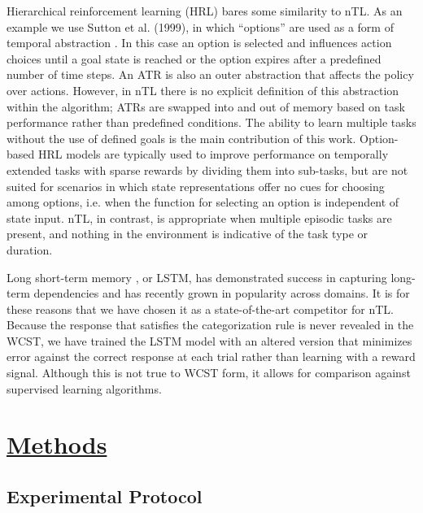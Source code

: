 \documentclass[10pt,letterpaper]{article}
\begin{document}
Hierarchical reinforcement learning (HRL) bares some similarity to nTL. As an example we use Sutton et al. (1999), in which ``options'' are used as a form of temporal abstraction \cite{sutton_between_1999}. In this case an option is selected and influences action choices until a goal state is reached or the option expires after a predefined number of time steps. An ATR is also an outer abstraction that affects the policy over actions. However, in nTL there is no explicit definition of this abstraction within the algorithm; ATRs are swapped into and out of memory based on task performance rather than predefined conditions. The ability to learn multiple tasks without the use of defined goals is the main contribution of this work. Option-based HRL models are typically used to improve performance on temporally extended tasks with sparse rewards by dividing them into sub-tasks, but are not suited for scenarios in which state representations offer no cues for choosing among options, i.e. when the function for selecting an option is independent of state input. nTL, in contrast, is appropriate when multiple episodic tasks are present, and nothing in the environment is indicative of the task type or duration.

Long short-term memory \cite{hochreiter_long_1997}, or LSTM, has demonstrated success in capturing long-term dependencies and has recently grown in popularity across domains. It is for these reasons that we have chosen it as a state-of-the-art competitor for nTL. Because the response that satisfies the categorization rule is never revealed in the WCST, we have trained the LSTM model with an altered version that minimizes error against the correct response at each trial rather than learning with a reward signal. Although this is not true to WCST form, it allows for comparison against supervised learning algorithms.

\section{\underline{Methods}}

\subsection{Experimental Protocol}
\label{sec:exp}
\end{document}
